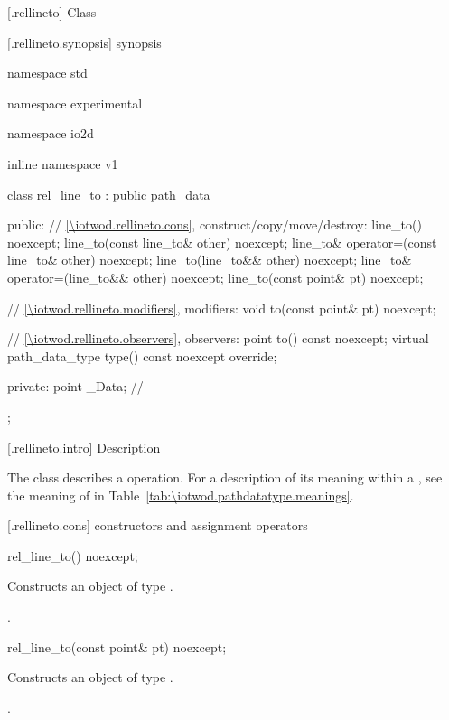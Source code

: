  [\iotwod.rellineto] {Class }

 [\iotwod.rellineto.synopsis] { synopsis}

\begin{codeblock}
namespace std { namespace experimental { namespace io2d { inline namespace v1 {
  class rel_line_to : public path_data {
  public:
    // \ref{\iotwod.rellineto.cons}, construct/copy/move/destroy:
    line_to() noexcept;
    line_to(const line_to& other) noexcept;
    line_to& operator=(const line_to& other) noexcept;
    line_to(line_to&& other) noexcept;
    line_to& operator=(line_to&& other) noexcept;
    line_to(const point& pt) noexcept;

    // \ref{\iotwod.rellineto.modifiers}, modifiers:
    void to(const point& pt) noexcept;

    // \ref{\iotwod.rellineto.observers}, observers:
    point to() const noexcept;
    virtual path_data_type type() const noexcept override;
    
  private:
    point _Data; // \expos
  };
} } } }
\end{codeblock}

 [\iotwod.rellineto.intro] { Description}

\pnum
{}
The class  describes a  operation. For a description of its meaning within a , see the meaning of  in Table~\ref{tab:\iotwod.pathdatatype.meanings}.

 [\iotwod.rellineto.cons] { constructors and assignment operators}

\begin{itemdecl}
    rel_line_to() noexcept;
\end{itemdecl}
\begin{itemdescr}
	\pnum
	\effects
	Constructs an object of type .
	
	\pnum
	\postconditions
	.
\end{itemdescr}

\begin{itemdecl}
    rel_line_to(const point& pt) noexcept;
\end{itemdecl}
\begin{itemdescr}
	\pnum
	\effects
	Constructs an object of type .
	
	\pnum
	\postconditions
	.
\end{itemdescr}

